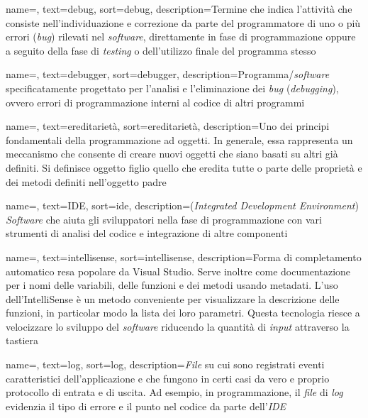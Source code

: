 {
    name=,
    text=debug,
    sort=debug,
    description={Termine che indica l’attività che
    consiste nell’individuazione e correzione da parte del programmatore di uno o più
    errori (\textit{bug}) rilevati nel \textit{software}, direttamente in fase di programmazione oppure
    a seguito della fase di \textit{testing} o dell’utilizzo finale del programma stesso \cite{site:wiki}}
}

{
    name=,
    text=debugger,
    sort=debugger,
    description={Programma/\textit{software} specificatamente
    progettato per l’analisi e l’eliminazione dei \textit{bug} (\textit{debugging}), ovvero errori di
    programmazione interni al codice di altri programmi \cite{site:wiki}}
}

{
    name=,
    text=ereditarietà,
    sort=ereditarietà,
    description={Uno dei principi fondamentali della programmazione ad oggetti. In
    generale, essa rappresenta un meccanismo che consente di creare nuovi oggetti
    che siano basati su altri già definiti. Si definisce oggetto figlio 
    quello che eredita tutte o parte delle proprietà e dei metodi definiti nell’oggetto
    padre \cite{site:wiki}}
}

{
    name=,
    text=IDE,
    sort=ide,
    description={(\textit{Integrated Development Environment})
    \textit{Software} che aiuta gli sviluppatori nella fase di programmazione con vari strumenti
    di analisi del codice e integrazione di altre componenti \cite{site:wiki}}
}

{
    name=,
    text=intellisense,
    sort=intellisense,
    description={Forma di completamento automatico resa popolare da Visual Studio.
    Serve inoltre come documentazione per i
    nomi delle variabili, delle funzioni e dei metodi usando metadati. L’uso
    dell’IntelliSense è un metodo conveniente per visualizzare la descrizione delle
    funzioni, in particolar modo la lista dei loro parametri. Questa tecnologia riesce
    a velocizzare lo sviluppo del \textit{software} riducendo la quantità di \textit{input} attraverso
    la tastiera \cite{site:wiki}}
}

{
    name=,
    text=log,
    sort=log,
    description={\textit{File} su cui sono registrati eventi caratteristici dell’applicazione e che fungono
    in certi casi da vero e proprio protocollo di entrata e di uscita. Ad esempio, in
    programmazione, il \textit{file} di \textit{log} evidenzia il tipo di errore e il punto nel codice
    da parte dell’\textit{IDE} \cite{site:wiki}}
}

